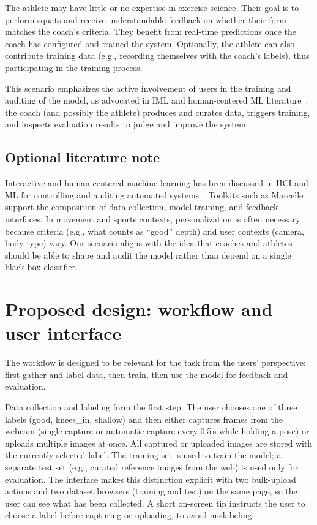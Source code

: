 \documentclass[10pt,twocolumn]{article}
\begin{document}
The athlete may have little or no expertise in exercise science. Their goal is to perform squats and receive understandable feedback on whether their form matches the coach's criteria. They benefit from real-time predictions once the coach has configured and trained the system. Optionally, the athlete can also contribute training data (e.g., recording themselves with the coach's labels), thus participating in the training process.

This scenario emphasizes the active involvement of users in the training and auditing of the model, as advocated in IML and human-centered ML literature~\cite{iml,marcelle}: the coach (and possibly the athlete) produces and curates data, triggers training, and inspects evaluation results to judge and improve the system.

\subsection{Optional literature note}

Interactive and human-centered machine learning has been discussed in HCI and ML for controlling and auditing automated systems~\cite{iml}. Toolkits such as Marcelle~\cite{marcelle} support the composition of data collection, model training, and feedback interfaces. In movement and sports contexts, personalization is often necessary because criteria (e.g., what counts as ``good'' depth) and user contexts (camera, body type) vary. Our scenario aligns with the idea that coaches and athletes should be able to shape and audit the model rather than depend on a single black-box classifier.

\section{Proposed design: workflow and user interface}

The workflow is designed to be relevant for the task from the users' perspective: first gather and label data, then train, then use the model for feedback and evaluation.

Data collection and labeling form the first step. The user chooses one of three labels (good, knees\_in, shallow) and then either captures frames from the webcam (single capture or automatic capture every 0.5\,s while holding a pose) or uploads multiple images at once. All captured or uploaded images are stored with the currently selected label. The training set is used to train the model; a separate test set (e.g., curated reference images from the web) is used only for evaluation. The interface makes this distinction explicit with two bulk-upload actions and two dataset browsers (training and test) on the same page, so the user can see what has been collected. A short on-screen tip instructs the user to choose a label before capturing or uploading, to avoid mislabeling.
\end{document}

